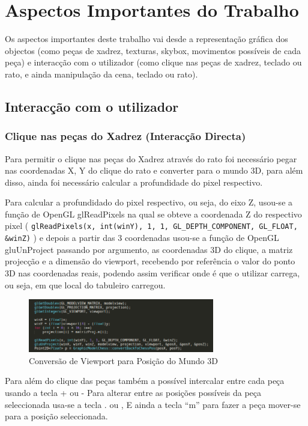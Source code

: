 \documentclass[portugues,final]{revdetua}
\begin{document}
\section{Aspectos Importantes do Trabalho}

Os aspectos importantes deste trabalho vai desde a representação gráfica dos objectos (como peças de xadrez, texturas, skybox, movimentos possíveis de cada peça) e interacção com o utilizador (como clique nas peças de xadrez, teclado ou rato, e ainda manipulação da cena, teclado ou rato).

\subsection{Interacção com o utilizador}

\subsubsection{Clique nas peças do Xadrez (Interacção Directa)}

Para permitir o clique nas peças do Xadrez através do rato foi necessário pegar nas coordenadas X, Y do clique do rato e converter para o mundo 3D, para além disso, ainda foi necessário calcular a profundidade do pixel respectivo\cite{objectsel}.

Para calcular a profundidado do pixel respectivo, ou seja, do eixo Z, usou-se a função de OpenGL glReadPixels na qual se obteve a coordenada Z do respectivo pixel ( {\tt glReadPixels(x, int(winY), 1, 1, GL\_DEPTH\_COMPONENT, GL\_FLOAT, \&winZ)} ) e depois a partir das 3 coordenadas usou-se a função de OpenGL gluUnProject passando por argumento, as coordenadas 3D do clique, a matriz projecção e a dimensão do viewport, recebendo por referência o valor do ponto 3D nas coordenadas reais, podendo assim verificar onde é que o utilizar carrega, ou seja, em que local do tabuleiro carregou.

\begin{figure}[H]
\centerline{\includegraphics[width=230pt]{images/unproject.png}}
\caption{Conversão de Viewport para Posição do Mundo 3D}
\label{img:complete}
\end{figure}

Para além do clique das peças também a possível intercalar entre cada peça usando a tecla + ou -
Para alterar entre as posições possíveis da peça seleccionada usa-se a tecla . ou ,
E ainda a tecla ``m'' para fazer a peça mover-se para a posição seleccionada.
\end{document}
